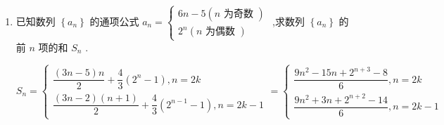\begin{enumerate}
\begin{jieda}
        因为 $ d > 0,{a}_{2} = \dfrac{3}{2} $ ,所以 $ {a}_{3} > 0 $ ,所以 $ {a}_{3} = 5{a}_{1} = {a}_{1} + {2d} $ ,即 $ d = 2{a}_{1} $
    
        因为 $ {a}_{2} = \dfrac{3}{2} = {a}_{1} + d = 3{a}_{1} $ ,所以 $ {a}_{1} = \dfrac{1}{2},d = 1 $
        所以 $ {a}_{n} = \dfrac{1}{2} + \left( {n - 1}\right)  = n - \dfrac{1}{2} = \dfrac{{2n} - 1}{2} $
        所以 $ {b}_{n} = \dfrac{1}{\left( {{2n} + 1}\right) {a}_{n}} = \dfrac{2}{\left( {{2n} - 1}\right) \left( {{2n} + 1}\right) } = \dfrac{1}{{2n} - 1} - \dfrac{1}{{2n} + 1} $
        
        所以 $ \left\{  {b}_{n}\right\} $ 的前 $ n $ 项和 $ {T}_{n} = {b}_{1} + {b}_{2} + \cdots  + {b}_{n} = 1 - \dfrac{1}{3} + \dfrac{1}{3} - \dfrac{1}{5} + \cdots  + \dfrac{1}{{2n} - 1} - \dfrac{1}{{2n} + 1} = 1 - \dfrac{1}{{2n} + 1} = \dfrac{2n}{{2n} + 1} $
        
        所以 $ \left\{  {b}_{n}\right\} $ 的前 2022 项和为 $ {T}_{2022} = \dfrac{2 \times  {2022}}{2 \times  {2022} + 1} = \dfrac{4044}{4045} $
        \end{jieda}

    
    \item 已知数列 $\left\{  {a}_{n}\right\}$ 的通项公式 ${a}_{n} = \left\{  \begin{array}{l} {6n} - 5\left( {n\text{ 为奇数 }}\right) \\  {2}^{n}\left( {n\text{ 为偶数 }}\right)  \end{array}\right.$ ,求数列 $\left\{  {a}_{n}\right\}$ 的前 $n$ 项的和 ${S}_{n}$ .
    \begin{jieda}
    
        ${S}_{n} = \left\{  {\begin{array}{l} \dfrac{\left( {{3n} - 5}\right) n}{2} + \dfrac{4}{3}\left( {{2}^{n} - 1}\right) ,n = {2k} \\  \dfrac{\left( {{3n} - 2}\right) \left( {n + 1}\right) }{2} + \dfrac{4}{3}\left( {{2}^{n - 1} - 1}\right) ,n = {2k} - 1 \end{array} = \left\{  \begin{array}{l} \dfrac{9{n}^{2} - {15n} + {2}^{n + 3} - 8}{6},n = {2k} \\  \dfrac{9{n}^{2} + {3n} + {2}^{n + 2} - {14}}{6},n = {2k} - 1 \end{array}\right. }\right.$
    \end{jieda}


\end{enumerate}
